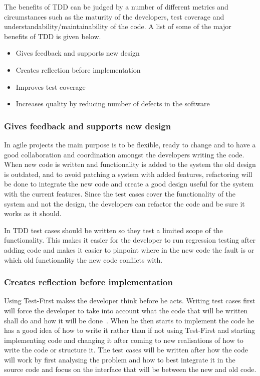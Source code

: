 The benefits of TDD can be judged by a number of different metrics and circumstances such as the maturity of the developers, test coverage and understandability/maintainability of the code. A list of some of the major benefits of TDD is given below.

\begin{itemize}
\item Gives feedback and supports new design
\item Creates reflection before implementation
\item Improves test coverage
\item Increases quality by reducing number of defects in the software
\end{itemize}

\subsubsection*{Gives feedback and supports new design}
In agile projects the main purpose is to be flexible, ready to change and to have a good collaboration and coordination amongst the developers writing the code. When new code is written and functionality is added to the system the old design is outdated, and to avoid patching a system with added features, refactoring will be done to integrate the new code and create a good design useful for the system with the current features. 
Since the test cases cover the functionality of the system and not the design, the developers can refactor the code and be sure it works as it should. 

In TDD test cases should be written so they test a limited scope of the functionality. This makes it easier for the developer to run regression testing after adding code and makes it easier to pinpoint where in the new code the fault is or which old functionality the new code conflicts with.

\subsubsection*{Creates reflection before implementation}
Using Test-First makes the developer think before he acts. Writing test cases first will force the developer to take into account what the code that will be written shall do and how it will be done~\cite{erdogmus}. When he then starts to implement the code he has a good idea of how to write it rather than if not using Test-First and starting implementing code and changing it after coming to new realisations of how to write the code or structure it. The test cases will be written after how the code will work by first analysing the problem and how to best integrate it in the source code and focus on the interface that will be between the new and old code.

